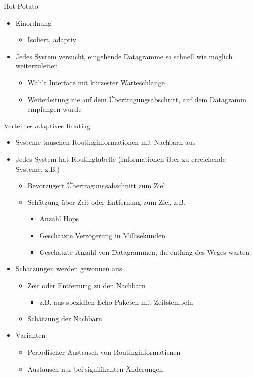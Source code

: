       Hot Potato
      \begin{itemize}
        \item Einordnung
          \begin{itemize}
            \item Isoliert, adaptiv
          \end{itemize}
        \item Jedes System versucht, eingehende Datagramme so schnell wie möglich weiterzuleiten
          \begin{itemize}
            \item Wählt Interface mit kürzester Warteschlange
            \item Weiterleitung nie auf dem Übertragungsabschnitt, auf dem Datagramm empfangen wurde
          \end{itemize}
      \end{itemize}
      Verteiltes adaptives Routing
      \begin{itemize}
        \item Systeme tauschen Routinginformationen mit Nachbarn aus
        \item Jedes System hat Routingtabelle (Informationen über zu erreichende Systeme, z.B.)
          \begin{itemize}
            \item Bevorzugert Übertragungsabschnitt zum Ziel
            \item Schätzung über Zeit oder Entfernung zum Ziel, z.B.
              \begin{itemize}
                \item Anzahl Hops
                \item Geschätzte Verzögerung in Millisekunden
                \item Geschätzte Anzahl von Datagrammen, die entlang des Weges warten
              \end{itemize}
          \end{itemize}
        \item Schätzungen werden gewonnen aus
          \begin{itemize}
            \item Zeit oder Entfernung zu den Nachbarn
              \begin{itemize}
                \item z.B. aus speziellen Echo-Paketen mit Zeitstempeln
              \end{itemize}
            \item Schätzung der Nachbarn
          \end{itemize}
        \item Varianten
          \begin{itemize}
            \item Periodischer Austausch von Routinginformationen
            \item Austausch nur bei signifikanten Änderungen
          \end{itemize}
      \end{itemize}
